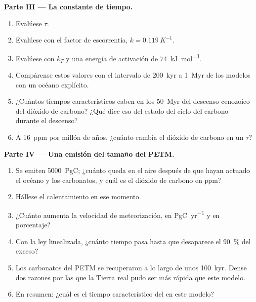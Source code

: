\begin{problem}
\noindent\textbf{Parte III --- La constante de tiempo.}
\begin{enumerate}[resume]
  \item Evalúese $\tau$.
  \item Evalúese con el factor de escorrentía, $k = \qty{0.119}{K^{-1}}$.
  \item Evalúese con $k_T$ y una energía de activación de \qty{74}{kJ.mol^{-1}}.
  \item Compárense estos valores con el intervalo de \qty{200}{kyr} a \qty{1}{Myr} de los modelos con un océano explícito.
  \item ¿Cuántos tiempos característicos caben en los \qty{50}{Myr} del descenso cenozoico del dióxido
        de carbono? ¿Qué dice eso del estado del ciclo del carbono durante el descenso?
  \item A \qty{16}{ppm} por millón de años, ¿cuánto cambia el dióxido de carbono en un $\tau$?
\end{enumerate}

\noindent\textbf{Parte IV --- Una emisión del tamaño del PETM.}
\begin{enumerate}[resume]
  \item Se emiten \qty{5000}{PgC}; ¿cuánto queda en el aire después de que hayan actuado el océano y los carbonatos,
        y cuál es el dióxido de carbono en ppm?
  \item Hállese el calentamiento en ese momento.
  \item ¿Cuánto aumenta la velocidad de meteorización, en \unit{PgC.yr^{-1}} y en porcentaje?
  \item Con la ley linealizada, ¿cuánto tiempo pasa hasta que desaparece el \qty{90}{\percent} del exceso?
  \item Los carbonatos del PETM se recuperaron a lo largo de unos \qty{100}{kyr}. Dense dos razones por las que la Tierra
        real pudo ser más rápida que este modelo.
  \item En resumen: ¿cuál es el tiempo característico del  en este modelo?
\end{enumerate}
\end{problem}
